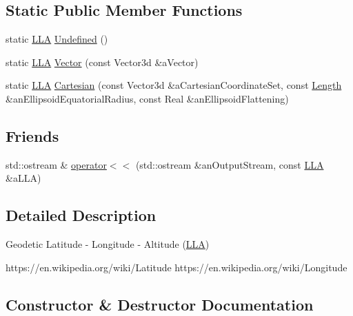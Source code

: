 \subsection*{Static Public Member Functions}
\begin{DoxyCompactItemize}
\item 
static \hyperlink{classlibrary_1_1physics_1_1coord_1_1spherical_1_1_l_l_a}{L\+LA} \hyperlink{classlibrary_1_1physics_1_1coord_1_1spherical_1_1_l_l_a_a5e95fa01c321b58df585f510bfa27eea}{Undefined} ()
\item 
static \hyperlink{classlibrary_1_1physics_1_1coord_1_1spherical_1_1_l_l_a}{L\+LA} \hyperlink{classlibrary_1_1physics_1_1coord_1_1spherical_1_1_l_l_a_af20391360cdab4dbd94afb3d4ddeddbc}{Vector} (const Vector3d \&a\+Vector)
\item 
static \hyperlink{classlibrary_1_1physics_1_1coord_1_1spherical_1_1_l_l_a}{L\+LA} \hyperlink{classlibrary_1_1physics_1_1coord_1_1spherical_1_1_l_l_a_af48c6fa8a250c20befa8452d234537d1}{Cartesian} (const Vector3d \&a\+Cartesian\+Coordinate\+Set, const \hyperlink{classlibrary_1_1physics_1_1units_1_1_length}{Length} \&an\+Ellipsoid\+Equatorial\+Radius, const Real \&an\+Ellipsoid\+Flattening)
\end{DoxyCompactItemize}
\subsection*{Friends}
\begin{DoxyCompactItemize}
\item 
std\+::ostream \& \hyperlink{classlibrary_1_1physics_1_1coord_1_1spherical_1_1_l_l_a_a4e052cf41d11b11c943ad32cd4c25ba8}{operator$<$$<$} (std\+::ostream \&an\+Output\+Stream, const \hyperlink{classlibrary_1_1physics_1_1coord_1_1spherical_1_1_l_l_a}{L\+LA} \&a\+L\+LA)
\end{DoxyCompactItemize}


\subsection{Detailed Description}
Geodetic Latitude -\/ Longitude -\/ Altitude (\hyperlink{classlibrary_1_1physics_1_1coord_1_1spherical_1_1_l_l_a}{L\+LA}) 

https\+://en.wikipedia.\+org/wiki/\+Latitude https\+://en.wikipedia.\+org/wiki/\+Longitude 

\subsection{Constructor \& Destructor Documentation}
\mbox{\label{classlibrary_1_1physics_1_1coord_1_1spherical_1_1_l_l_a_af18b9011d2df6c1120e0f770ab1eb909}} 
